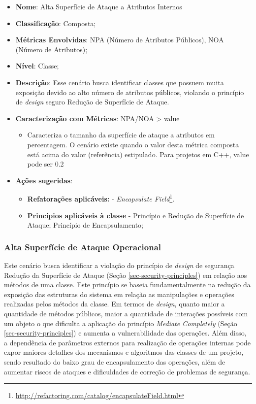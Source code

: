 \begin{itemize}
\item \textbf{Nome}: Alta Superfície de Ataque a Atributos Internos
\item \textbf{Classificação}: Composta;
\item \textbf{Métricas Envolvidas}: NPA (Número de Atributos Públicos), NOA (Número de Atributos);
\item \textbf{Nível}: Classe;
\item \textbf{Descrição}: Esse cenário busca identificar classes que possuem muita exposição devido ao alto número de atributos públicos, violando o princípio de \emph{design} seguro Redução de Superfície de Ataque.
\item \textbf{Caracterização com Métricas}: NPA/NOA > value
	\begin{itemize}
	\item Caracteriza o tamanho da superfície de ataque a atributos em percentagem. O cenário existe quando o valor desta métrica composta está acima do valor (referência) estipulado. Para projetos em C++, value pode ser 0.2
	\end{itemize}
\item \textbf{Ações sugeridas}:
	\begin{itemize}
	\item \textbf{Refatorações aplicáveis:} - \emph{Encapsulate Field}\footnote{\url{http://refactoring.com/catalog/encapsulateField.html}}.
	\item \textbf{Princípios aplicáveis à classe} - Princípio e Redução de Superfície de Ataque; Princípio de Encapsulamento;
	\end{itemize}
\end{itemize}

\subsubsection{Alta Superfície de Ataque Operacional}

Este cenário busca identificar a violação do princípio de \emph{design} de segurança Redução da Superfície de Ataque (Seção \ref{sec-security-principles}) em relação aos métodos de uma classe. Este princípio se baseia fundamentalmente na redução da exposição das estruturas do sistema em relação as manipulações e operações realizadas pelos métodos da classe. Em termos de \emph{design}, quanto maior a quantidade de métodos públicos, maior a quantidade de interações possíveis com um objeto o que dificulta a aplicação do princípio \emph{Mediate Completely} (Seção \ref{sec-security-principles}) e aumenta a vulnerabilidade das operações. Além disso, a dependência de parâmetros externos para realização de operações internas pode expor maiores detalhes dos mecanismos e algoritmos das classes de um projeto, sendo resultado do baixo grau de encapsulamento das operações, além de aumentar riscos de ataques e dificuldades de correção de problemas de segurança. 

